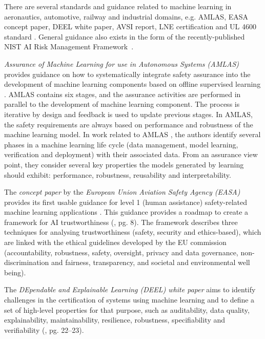 There are several standards and guidance related to machine learning in aeronautics, automotive, railway and industrial domains, e.g. AMLAS, EASA concept paper, DEEL white paper, AVSI report, LNE certification and UL 4600 standard \cite{Kaakai2022}. General guidance also exists in the form of the recently-published NIST AI Risk Management Framework~\cite{airmf}.

\textit{Assurance of Machine Learning for use in Autonomous Systems (AMLAS)} provides guidance on how to systematically integrate safety assurance into the development of machine learning components based on offline supervised learning \cite{Hawkins2021}. 
AMLAS contains six stages, and the assurance activities are performed in parallel to the development of machine learning component. The process is iterative by design and feedback is used to update previous stages. In AMLAS, the safety requirements are always based on performance and robustness of the machine learning model. In work related to AMLAS \cite{Ashmore2021}, the authors identify several phases in a machine learning life cycle (data management, model learning, verification and deployment) with their associated data. From an assurance view point, they consider several key properties the models generated by learning should exhibit: performance, robustness, reusability and interpretability.

The \textit{concept paper} by the \textit{European Union Aviation Safety Agency (EASA)} provides its first usable guidance for level 1 (human assistance) safety-related machine learning applications \cite{EASA2021}. 
This guidance provides a roadmap to create a framework for AI trustworthiness (\cite{EASA2021}, pg. 8). The framework describes three techniques for analysing trustworthiness (safety, security and ethics-based), which are linked with the ethical guidelines developed by the EU commission (accountability, robustness, safety, oversight, privacy and data governance, non-discrimination and fairness, transparency, and societal and environmental well being). 

The \textit{DEpendable and Explainable Learning (DEEL) white paper} aims to identify challenges in the certification of systems using machine learning and to define a set of high-level properties for that purpose, such as auditability, data quality, explainability, maintainability, resilience, robustness, specifiability and verifiability (\cite{Mamalet2021}, pg. 22–23). 

